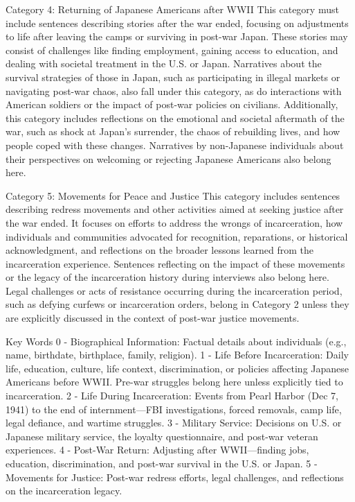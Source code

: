 Category 4: Returning of Japanese Americans after WWII 
This category must include sentences describing stories after the war ended, focusing on adjustments to life after leaving the camps or surviving in post-war Japan. These stories may consist of challenges like finding employment, gaining access to education, and dealing with societal treatment in the U.S. or Japan. Narratives about the survival strategies of those in Japan, such as participating in illegal markets or navigating post-war chaos, also fall under this category, as do interactions with American soldiers or the impact of post-war policies on civilians.
Additionally, this category includes reflections on the emotional and societal aftermath of the war, such as shock at Japan's surrender, the chaos of rebuilding lives, and how people coped with these changes. Narratives by non-Japanese individuals about their perspectives on welcoming or rejecting Japanese Americans also belong here. 

Category 5: Movements for Peace and Justice
This category includes sentences describing redress movements and other activities aimed at seeking justice after the war ended. It focuses on efforts to address the wrongs of incarceration, how individuals and communities advocated for recognition, reparations, or historical acknowledgment, and reflections on the broader lessons learned from the incarceration experience. Sentences reflecting on the impact of these movements or the legacy of the incarceration history during interviews also belong here.
Legal challenges or acts of resistance occurring during the incarceration period, such as defying curfews or incarceration orders, belong in Category 2 unless they are explicitly discussed in the context of post-war justice movements.

Key Words
0 - Biographical Information: Factual details about individuals (e.g., name, birthdate, birthplace, family, religion).
1 - Life Before Incarceration: Daily life, education, culture, life context, discrimination, or policies affecting Japanese Americans before WWII. Pre-war struggles belong here unless explicitly tied to incarceration.
2 - Life During Incarceration: Events from Pearl Harbor (Dec 7, 1941) to the end of internment—FBI investigations, forced removals, camp life, legal defiance, and wartime struggles. 
3 - Military Service: Decisions on U.S. or Japanese military service, the loyalty questionnaire, and post-war veteran experiences.
4 - Post-War Return: Adjusting after WWII—finding jobs, education, discrimination, and post-war survival in the U.S. or Japan.
5 - Movements for Justice: Post-war redress efforts, legal challenges, and reflections on the incarceration legacy.






